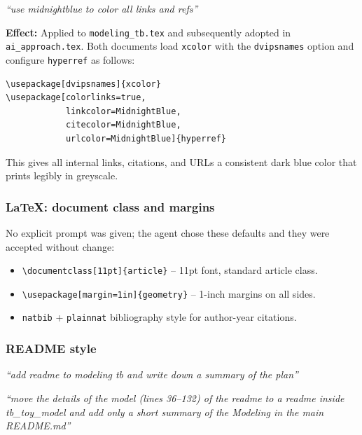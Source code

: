 \documentclass[11pt]{article}
\begin{document}
\begin{promptbox}
\textit{``use midnightblue to color all links and refs''}
\end{promptbox}

\noindent \textbf{Effect:} Applied to \texttt{modeling\_tb.tex} and subsequently adopted in \texttt{ai\_approach.tex}. Both documents load \texttt{xcolor} with the \texttt{dvipsnames} option and configure \texttt{hyperref} as follows:

\begin{verbatim}
\usepackage[dvipsnames]{xcolor}
\usepackage[colorlinks=true,
            linkcolor=MidnightBlue,
            citecolor=MidnightBlue,
            urlcolor=MidnightBlue]{hyperref}
\end{verbatim}

\noindent This gives all internal links, citations, and URLs a consistent dark blue color that prints legibly in greyscale.

\subsubsection{LaTeX: document class and margins}

No explicit prompt was given; the agent chose these defaults and they were accepted without change:
\begin{itemize}[noitemsep]
  \item \verb|\documentclass[11pt]{article}| -- 11pt font, standard article class.
  \item \verb|\usepackage[margin=1in]{geometry}| -- 1-inch margins on all sides.
  \item \texttt{natbib} + \texttt{plainnat} bibliography style for author-year citations.
\end{itemize}

\subsubsection{README style}

\begin{promptbox}
\textit{``add readme to modeling tb and write down a summary of the plan''}
\end{promptbox}

\begin{promptbox}
\textit{``move the details of the model (lines 36--132) of the readme to a readme inside tb\_toy\_model and add only a short summary of the Modeling in the main README.md''}
\end{promptbox}
\end{document}
